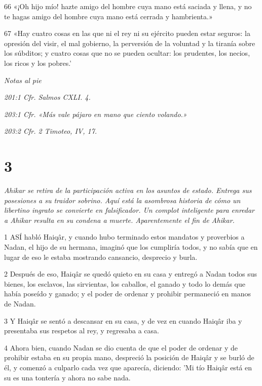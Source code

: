 \par 66 «¡Oh hijo mío! hazte amigo del hombre cuya mano está saciada y llena, y no te hagas amigo del hombre cuya mano está cerrada y hambrienta.»

\par 67 «Hay cuatro cosas en las que ni el rey ni su ejército pueden estar seguros: la opresión del visir, el mal gobierno, la perversión de la voluntad y la tiranía sobre los súbditos; y cuatro cosas que no se pueden ocultar: los prudentes, los necios, los ricos y los pobres.'

\par \textit{Notas al pie}

\par \textit{201:1 Cfr. Salmos CXLI. 4.}

\par \textit{203:1 Cfr. «Más vale pájaro en mano que ciento volando.»}

\par \textit{203:2 Cfr. 2 Timoteo, IV, 17.}

\chapter{3}

\par \textit{Ahikar se retira de la participación activa en los asuntos de estado. Entrega sus posesiones a su traidor sobrino. Aquí está la asombrosa historia de cómo un libertino ingrato se convierte en falsificador. Un complot inteligente para enredar a Ahikar resulta en su condena a muerte. Aparentemente el fin de Ahikar.}

\par 1 ASÍ habló Haiqâr, y cuando hubo terminado estos mandatos y proverbios a Nadan, el hijo de su hermana, imaginó que los cumpliría todos, y no sabía que en lugar de eso le estaba mostrando cansancio, desprecio y burla.

\par 2 Después de eso, Haiqâr se quedó quieto en su casa y entregó a Nadan todos sus bienes, los esclavos, las sirvientas, los caballos, el ganado y todo lo demás que había poseído y ganado; y el poder de ordenar y prohibir permaneció en manos de Nadan.

\par 3 Y Haiqâr se sentó a descansar en su casa, y de vez en cuando Haiqâr iba y presentaba sus respetos al rey, y regresaba a casa.

\par 4 Ahora bien, cuando Nadan se dio cuenta de que el poder de ordenar y de prohibir estaba en su propia mano, despreció la posición de Haiqâr y se burló de él, y comenzó a culparlo cada vez que aparecía, diciendo: 'Mi tío Haiqâr está en su es una tontería y ahora no sabe nada.


